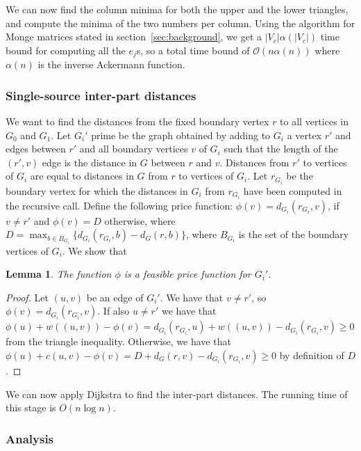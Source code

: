 \documentclass[11pt]{article}
\newtheorem{lemma}[theorem]{Lemma}
\begin{document}
We can now find the column minima for both the upper and the lower triangles, and compute the minima of the two numbers per column. Using the algorithm for Monge matrices stated in section~\ref{sec:background}, we get a $|V_c|\alpha(|V_c|)$ time bound for computing all the $e_j$s, so a total time bound of $\mathcal{O}(n\alpha(n))$ where $\alpha(n)$ is the inverse Ackermann function.


\subsubsection{Single-source inter-part distances}

We want to find the distances from the fixed boundary vertex $r$ to all vertices in $G_0$ and $G_1$. Let $G_i'$ prime be the graph obtained by adding to $G_i$ a vertex $r'$ and edges between $r'$ and all boundary vertices $v$ of $G_i$ such that the length of the $(r',v)$ edge is the distance in $G$ between $r$ and $v$. Distances from $r'$ to vertices of $G_i$ are equal to distances in $G$ from $r$ to vertices of $G_i$. Let $r_{G_i}$ be the boundary vertex for which the distances in $G_i$ from $r_{G_i}$ have been computed in the recursive call. Define the following price function: $\phi(v) = d_{G_i}(r_{G_i},v)$, if $v\neq r'$ and $\phi(v) = D$ otherwise, where $D = \max_{b\in B_{G_i}}\{d_{G_i}(r_{G_i},b)-d_G(r,b)\}$, where $B_{G_i}$ is the set of the boundary vertices of $G_i$. We show that\\

\begin{lemma}
The function $\phi$ is a feasible price function for $G_i'$.
\end{lemma}

\begin{proof}
Let $(u,v)$ be an edge of $G_i'$. We have that $v\neq r'$, so $\phi(v) = d_{G_i}(r_{G_i},v)$. If also $u\neq r'$ we have that $\phi(u) + w((u,v)) -\phi(v) = d_{G_i}(r_{G_i},u) + w((u,v)) - d_{G_i}(r_{G_i},v)\geq 0$ from the triangle inequality. Otherwise, we have that $\phi(u)+c(u,v)-\phi(v) = D + d_G(r,v) - d_{G_i}(r_{G_i},v)\geq 0$ by definition of $D$.
\end{proof}

We can now apply Dijkstra to find the inter-part distances. The running time of this stage is $O(n \log n)$.

\subsubsection{Analysis}
\label{sec:analysis-neg}
\end{document}
